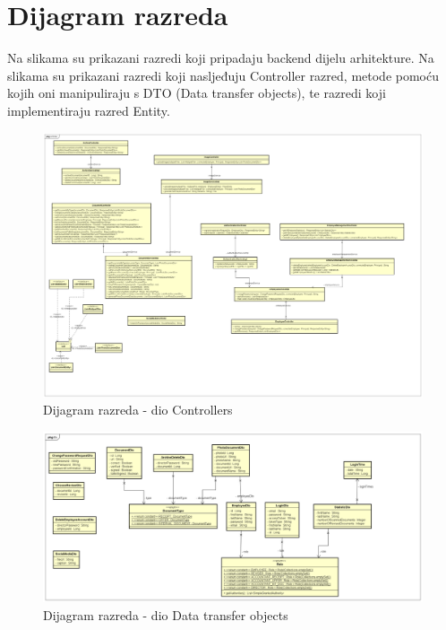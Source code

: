 				
			
			\eject
			
			
		\section{Dijagram razreda}

		Na slikama su prikazani razredi koji pripadaju backend dijelu arhitekture. Na slikama su prikazani razredi koji nasljeđuju Controller razred, metode pomoću kojih oni manipuliraju s DTO (Data transfer objects), te razredi koji implementiraju razred Entity.
		
			\begin{figure}[H]
				\includegraphics[scale=0.2]{slike/ControlerDiagram.png} %
				\centering
				\caption{Dijagram razreda - dio Controllers}
				\label{fig:promjene}
			\end{figure}
			
			\begin{figure}[H]
				\includegraphics[scale=0.3]{slike/DtoDiagram.png} %
				\centering
				\caption{Dijagram razreda - dio Data transfer objects}
				\label{fig:promjene}
			\end{figure}

